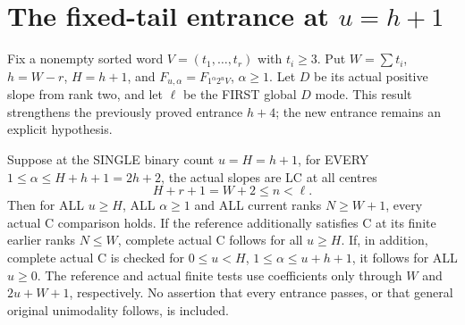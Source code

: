 \section{The fixed-tail entrance at $u=h+1$}
Fix a nonempty sorted word $V=(t_1,\ldots,t_r)$ with $t_i\ge3$.
Put $W=\sum t_i$, $h=W-r$, $H=h+1$, and
$F_{u,\alpha}=F_{1^\alpha2^uV}$, $\alpha\ge1$.
Let $D$ be its actual positive slope from rank two, and let $\ell$
be the FIRST global $D$ mode. This result strengthens the previously
proved entrance $h+4$; the new entrance remains an explicit hypothesis.

\begin{theorem}
Suppose at the SINGLE binary count $u=H=h+1$, for EVERY
$1\le\alpha\le H+h+1=2h+2$, the actual slopes are LC at all centres
\[
                         H+r+1=W+2\le n<\ell.           \tag{1}
\]
Then for ALL $u\ge H$, ALL $\alpha\ge1$ and ALL current ranks
$N\ge W+1$, every actual C comparison holds.
If the reference additionally satisfies C at its finite earlier
ranks $N\le W$, complete actual C follows for all $u\ge H$.
If, in addition, complete actual C is checked for
$0\le u<H$, $1\le\alpha\le u+h+1$, it follows for ALL $u\ge0$.
The reference and actual finite tests use coefficients only through
$W$ and $2u+W+1$, respectively. No assertion that every entrance
passes, or that general original unimodality follows, is included.
\end{theorem}

